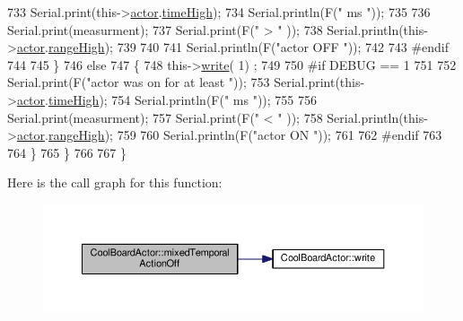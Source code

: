 \begin{DoxyCode}
733             Serial.print(this->\hyperlink{class_cool_board_actor_a8f190db9f7a39fddbcef7f152da970e9}{actor}.\hyperlink{struct_cool_board_actor_1_1state_a54cd4976b56aeaa6274fe0576aaebb0f}{timeHigh});
734             Serial.println(F(\textcolor{stringliteral}{" ms "}));
735 
736             Serial.print(measurment);
737             Serial.print(F(\textcolor{stringliteral}{" > "} ));
738             Serial.println(this->\hyperlink{class_cool_board_actor_a8f190db9f7a39fddbcef7f152da970e9}{actor}.\hyperlink{struct_cool_board_actor_1_1state_a6e5cd6c5cd44e2decfd8d4df1853f8e3}{rangeHigh});
739 
740             
741             Serial.println(F(\textcolor{stringliteral}{"actor OFF "}));
742 
743 \textcolor{preprocessor}{        #endif}
744 
745         \}
746         \textcolor{keywordflow}{else} 
747         \{
748             this->\hyperlink{class_cool_board_actor_a958786ff01ea1056ee72c72d439f86da}{write}( 1) ;
749 
750 \textcolor{preprocessor}{        #if DEBUG == 1 }
751             
752             Serial.print(F(\textcolor{stringliteral}{"actor was on for at least "}));
753             Serial.print(this->\hyperlink{class_cool_board_actor_a8f190db9f7a39fddbcef7f152da970e9}{actor}.\hyperlink{struct_cool_board_actor_1_1state_a54cd4976b56aeaa6274fe0576aaebb0f}{timeHigh});
754             Serial.println(F(\textcolor{stringliteral}{" ms "}));
755 
756             Serial.print(measurment);
757             Serial.print(F(\textcolor{stringliteral}{" < "} ));
758             Serial.println(this->\hyperlink{class_cool_board_actor_a8f190db9f7a39fddbcef7f152da970e9}{actor}.\hyperlink{struct_cool_board_actor_1_1state_a6e5cd6c5cd44e2decfd8d4df1853f8e3}{rangeHigh});
759 
760             Serial.println(F(\textcolor{stringliteral}{"actor ON "}));
761 
762 \textcolor{preprocessor}{        #endif              }
763 
764         \}           
765     \}
766 
767 \}
\end{DoxyCode}
Here is the call graph for this function\+:
\nopagebreak
\begin{figure}[H]
\begin{center}
\leavevmode
\includegraphics[width=350pt]{dc/d69/class_cool_board_actor_a00b29c4abf0388551aa6812372113cf1_cgraph}
\end{center}
\end{figure}
